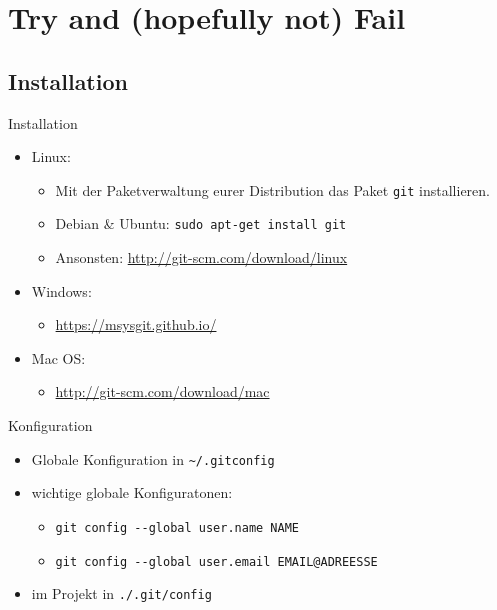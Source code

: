 \documentclass{beamer}
\begin{document}
\section{Try and (hopefully not) Fail}
\subsection{Installation}
\begin{frame}[fragile]{Installation}
	\begin{itemize}
		\item Linux:
			\begin{itemize}
				\item Mit der Paketverwaltung eurer Distribution das Paket \verb|git| installieren.
				\item Debian \& Ubuntu: \verb|sudo apt-get install git|
				\item Ansonsten: \url{http://git-scm.com/download/linux}
			\end{itemize}
		\item Windows:
			\begin{itemize}
				\item \url{https://msysgit.github.io/}
			\end{itemize}
		\item Mac OS:
			\begin{itemize}
				\item \url{http://git-scm.com/download/mac}
			\end{itemize}
	\end{itemize}
\end{frame}

\begin{frame}[fragile]{Konfiguration}
	\begin{itemize}
		\item Globale Konfiguration in \verb+~/.gitconfig+
		\item wichtige globale Konfiguratonen:
			\begin{itemize}
				\item \verb+git config --global user.name NAME+
				\item \verb+git config --global user.email EMAIL@ADREESSE+
			\end{itemize}
		\item im Projekt in \verb+./.git/config+
	\end{itemize}
\end{frame}
\end{document}
